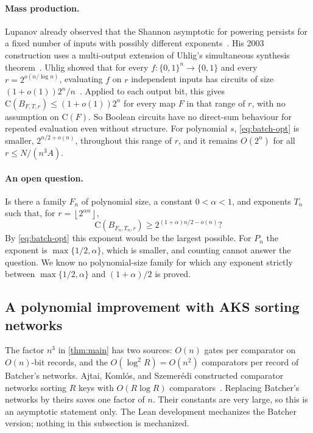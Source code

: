 \documentclass[11pt]{article}
\theoremstyle{definition}
\theoremstyle{remark}
\newcommand{\bits}{\{0,1\}}
\newcommand{\CC}{\mathrm{C}}
\newcommand{\floor}[1]{\left\lfloor #1\right\rfloor}
\numberwithin{equation}{section}
\begin{document}
\paragraph{Mass production.}
Lupanov already observed that the Shannon asymptotic for powering
persists for a fixed number of inputs with possibly different
exponents~\cite[p.~66]{Lupanov93}.  His 2003 construction uses a
multi-output extension of Uhlig's simultaneous synthesis
theorem~\cite[Addendum~1, Theorem~D1]{Lupanov03}.
Uhlig showed that for every $f:\bits^n\to\bits$ and every
$r=2^{o(n/\log n)}$, evaluating $f$ on $r$ independent inputs has
circuits of size $(1+o(1))2^n/n$~\cite{Uhlig74,Uhlig92}.  Applied to each
output bit, this gives $\CC(B_{F,T,r})\leq(1+o(1))2^n$ for every map $F$
in that range of $r$, with no assumption on $\CC(F)$.  So Boolean circuits
have no direct-sum behaviour for repeated evaluation even without
structure.  For polynomial $s$, \cref{eq:batch-opt} is smaller,
$2^{n/2+o(n)}$, throughout this range of $r$, and it remains $O(2^n)$
for all $r\leq N/(n^3A)$.

\paragraph{An open question.}
Is there a family $F_n$ of polynomial size, a constant $0<\alpha<1$,
and exponents $T_n$ such that, for $r=\floor{2^{\alpha n}}$,
\[
  \CC(B_{F_n,T_n,r})\geq 2^{(1+\alpha)n/2-o(n)}?
\]
By \cref{eq:batch-opt} this exponent would be the largest possible.  For
$P_n$ the exponent is $\max\{1/2,\alpha\}$, which is smaller, and
counting cannot answer the question.  We know no polynomial-size family
for which any exponent strictly between $\max\{1/2,\alpha\}$ and
$(1+\alpha)/2$ is proved.

\subsection{A polynomial improvement with AKS sorting networks}
\label{sec:aks}

The factor $n^3$ in \cref{thm:main} has two sources: $O(n)$ gates per
comparator on $O(n)$-bit records, and the $O(\log^2 R)=O(n^2)$ comparators
per record of Batcher's networks.  Ajtai, Koml\'os, and Szemer\'edi
constructed comparator networks sorting $R$ keys with $O(R\log R)$
comparators~\cite{AKS83}.  Replacing Batcher's networks by theirs saves
one factor of $n$.  Their constants are very large, so this is an
asymptotic statement only.  The Lean development mechanizes the Batcher
version; nothing in this subsection is mechanized.
\end{document}

